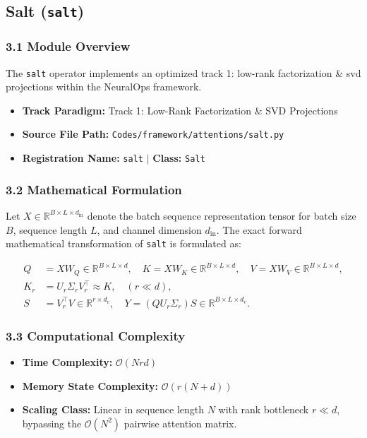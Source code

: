 \subsection{Salt (\texttt{salt})}
\label{sec:app_module_salt}

\subsubsection*{3.1 Module Overview}
The \texttt{salt} operator implements an optimized track 1: low-rank factorization \& svd projections within the NeuralOps framework.
\begin{itemize}
    \item \textbf{Track Paradigm:} Track 1: Low-Rank Factorization & SVD Projections
    \item \textbf{Source File Path:} \texttt{Codes/framework/attentions/salt.py}
    \item \textbf{Registration Name:} \texttt{salt} $\mid$ \textbf{Class:} \texttt{Salt}
\end{itemize}

\subsubsection*{3.2 Mathematical Formulation}
Let $X \in \mathbb{R}^{B \times L \times d_{\text{in}}}$ denote the batch sequence representation tensor for batch size $B$, sequence length $L$, and channel dimension $d_{\text{in}}$. The exact forward mathematical transformation of \texttt{salt} is formulated as:

\begin{align}
Q &= X W_Q \in \mathbb{R}^{B \times L \times d}, \quad K = X W_K \in \mathbb{R}^{B \times L \times d}, \quad V = X W_V \in \mathbb{R}^{B \times L \times d}, \\
K_r &= U_r \Sigma_r V_r^\top \approx K, \quad (r \ll d), \\
S &= V_r^\top V \in \mathbb{R}^{r \times d_v}, \quad Y = (Q U_r \Sigma_r) S \in \mathbb{R}^{B \times L \times d_v}.
\end{align}


\subsubsection*{3.3 Computational Complexity}
\begin{itemize}
    \item \textbf{Time Complexity:} $\mathcal{O}(N r d)$
    \item \textbf{Memory State Complexity:} $\mathcal{O}(r(N + d))$
    \item \textbf{Scaling Class:} Linear in sequence length $N$ with rank bottleneck $r \ll d$, bypassing the $\mathcal{O}(N^2)$ pairwise attention matrix.
\end{itemize}

